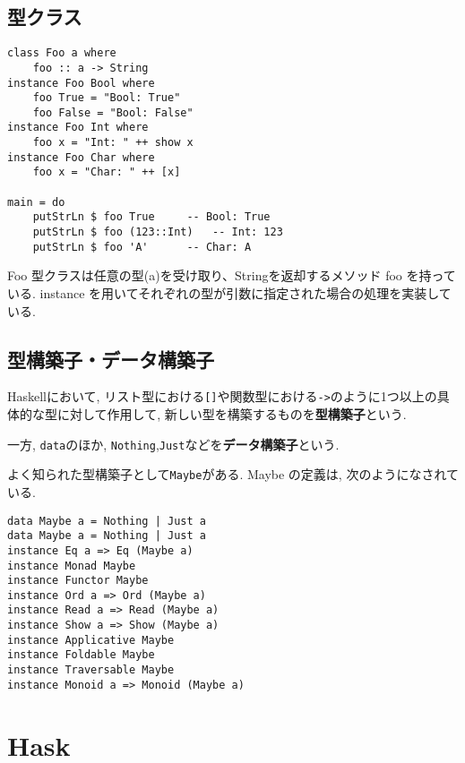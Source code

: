 \subsection{型クラス}
\begin{lstlisting}
class Foo a where
    foo :: a -> String
instance Foo Bool where
    foo True = "Bool: True"
    foo False = "Bool: False"
instance Foo Int where
    foo x = "Int: " ++ show x
instance Foo Char where
    foo x = "Char: " ++ [x]

main = do
    putStrLn $ foo True		-- Bool: True
    putStrLn $ foo (123::Int)	-- Int: 123
    putStrLn $ foo 'A'		-- Char: A
\end{lstlisting}
Foo 型クラスは任意の型(a)を受け取り、Stringを返却するメソッド foo を持っている. instance を用いてそれぞれの型が引数に指定された場合の処理を実装している.
\subsection{型構築子・データ構築子}
Haskellにおいて, リスト型における\verb|[]|や関数型における\verb|->|のように1つ以上の具体的な型に対して作用して, 新しい型を構築するものを{\bf 型構築子}という.

一方, \verb|data|のほか, \verb|Nothing|,\verb|Just|などを{\bf データ構築子}という.

よく知られた型構築子として\verb|Maybe|がある. Maybe の定義は, 次のようになされている.
\begin{lstlisting}
data Maybe a = Nothing | Just a
data Maybe a = Nothing | Just a         
instance Eq a => Eq (Maybe a) 
instance Monad Maybe 
instance Functor Maybe 
instance Ord a => Ord (Maybe a) 
instance Read a => Read (Maybe a) 
instance Show a => Show (Maybe a) 
instance Applicative Maybe 
instance Foldable Maybe 
instance Traversable Maybe 
instance Monoid a => Monoid (Maybe a) 
\end{lstlisting}



\section{Hask}
